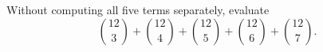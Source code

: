 Without computing all five terms separately, evaluate
\[\binom{12}{3}+\binom{12}{4}+\binom{12}{5}+\binom{12}{6}+\binom{12}{7}.\]
